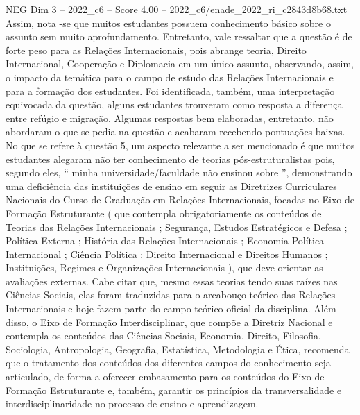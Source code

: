 \begin{textsample}{NEG Dim 3 – 2022\_c6 – Score 4.00 – 2022\_c6/enade\_2022\_ri\_c2843d8b68.txt}
Assim, nota -se que muitos estudantes possuem conhecimento básico sobre o assunto sem muito aprofundamento.
Entretanto, vale ressaltar que a questão é de forte peso para as Relações Internacionais, pois abrange teoria, Direito Internacional, Cooperação e Diplomacia em um único assunto, observando, assim, o impacto da temática para o campo de estudo das Relações Internacionais e para a formação dos estudantes.
Foi identificada, também, uma interpretação equivocada da questão, alguns estudantes trouxeram como resposta a diferença entre refúgio e migração.
Algumas respostas bem elaboradas, entretanto, não abordaram o que se pedia na questão e acabaram recebendo pontuações baixas.
No que se refere à questão 5, um aspecto relevante a ser mencionado é que muitos estudantes alegaram não ter conhecimento de teorias pós-estruturalistas pois, segundo eles, “ minha universidade/faculdade não ensinou sobre ”, demonstrando uma deficiência das instituições de ensino em seguir as Diretrizes Curriculares Nacionais do Curso de Graduação em Relações Internacionais, focadas no Eixo de Formação Estruturante ( que contempla obrigatoriamente os conteúdos de Teorias das Relações Internacionais ; Segurança, Estudos Estratégicos e Defesa ; Política Externa ; História das Relações Internacionais ; Economia Política Internacional ; Ciência Política ; Direito Internacional e Direitos Humanos ; Instituições, Regimes e Organizações Internacionais ), que deve orientar as avaliações externas.
Cabe citar que, mesmo essas teorias tendo suas raízes nas Ciências Sociais, elas foram traduzidas para o arcabouço teórico das Relações Internacionais e hoje fazem parte do campo teórico oficial da disciplina.
Além disso, o Eixo de Formação Interdisciplinar, que compõe a Diretriz Nacional e contempla os conteúdos das Ciências Sociais, Economia, Direito, Filosofia, Sociologia, Antropologia, Geografia, Estatística, Metodologia e Ética, recomenda que o tratamento dos conteúdos dos diferentes campos do conhecimento seja articulado, de forma a oferecer embasamento para os conteúdos do Eixo de Formação Estruturante e, também, garantir os princípios da transversalidade e interdisciplinaridade no processo de ensino e aprendizagem.

\end{textsample}
